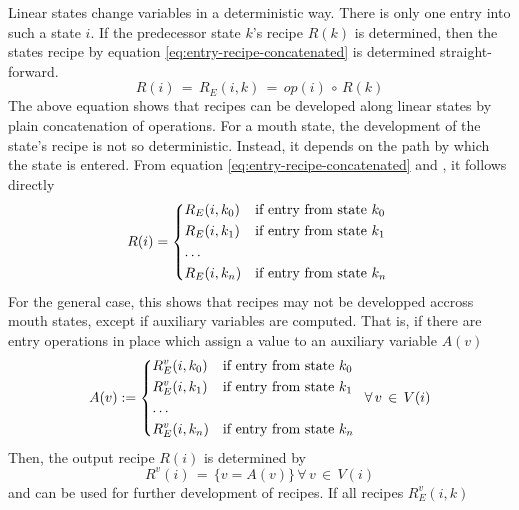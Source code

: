 \documentclass[12pt,a4paper]{scrartcl}
\begin{document}
Linear states change variables in a deterministic way. There is only one entry
into such a state $i$. If the predecessor state $k$'s recipe $R(k)$ is
determined, then the states recipe by equation \eqref{eq:entry-recipe-concatenated} 
is determined straight-forward.
\begin{equation} \label{eq:linear-state-recipe}
    R(i) \,=\,R_E(i,k) \,=\, op(i)\,\circ\,R(k)
\end{equation}
The above equation shows that recipes can be developed along linear states by
plain concatenation of operations.  For a mouth state, the development of the
state's recipe is not so deterministic.  Instead, it depends on the path by
which the state is entered.  From equation \eqref{eq:entry-recipe-concatenated}
and \label{eq:interference}, it follows directly
\begin{equation} \label{eq:mouth-state-recipe}
    R(i) = \begin{dcases*}
             R_E(i,k_0) & if entry from state $k_0$ \\
             R_E(i,k_1) & if entry from state $k_1$ \\
             \ldots \\
             R_E(i,k_n) & if entry from state $k_n$ \\
            \end{dcases*}
\end{equation}
For the general case, this shows that recipes may not be developped accross
mouth states, except if auxiliary variables are computed. That is, if there
are entry operations in place which assign a value to an auxiliary variable $A(v)$
\begin{equation}
    A(v) :=  \begin{dcases*}
             R^v_E(i,k_0) & if entry from state $k_0$ \\
             R^v_E(i,k_1) & if entry from state $k_1$ \\
             \ldots \\
             R^v_E(i,k_n) & if entry from state $k_n$ \\
            \end{dcases*}
            \,\forall\,v\,\in\,V(i)
\end{equation}
Then, the output recipe $R(i)$ is determined by
\begin{equation}
    R^v(i) \,=\, \{ v = A(v) \}\,\forall\,v\,\in\,V(i)
\end{equation}
and can be used for further development of recipes. If all recipes $R^v_E(i,k)$
\end{document}
